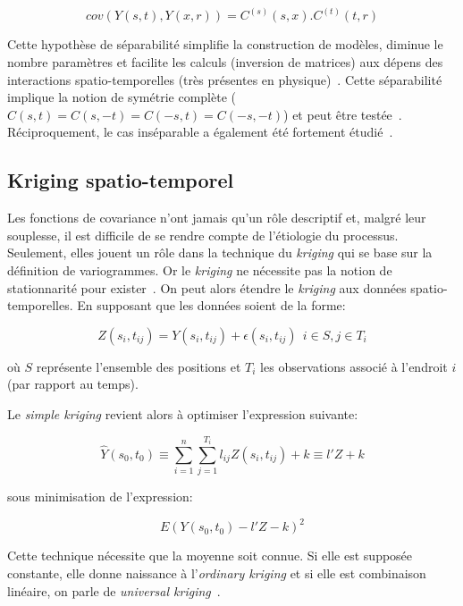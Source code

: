 \begin{equation}
    cov(Y(s, t), Y(x, r)) = C^{(s)}(s, x) . C^{(t)}(t, r)
\end{equation}

Cette hypothèse de séparabilité simplifie la construction de modèles, diminue le nombre paramètres et facilite les calculs (inversion de matrices) aux dépens des interactions spatio-temporelles (très présentes en physique)~\cite{genton2007separable}. Cette séparabilité implique la notion de symétrie complète ($C(s, t) = C(s, -t) = C(-s, t) = C(-s, -t)$) et peut être testée~\cite{fuentes2006testing}. Réciproquement, le cas inséparable a également été fortement étudié~\cite{fuentes2008class}.

\subsection{Kriging spatio-temporel}

Les fonctions de covariance n'ont jamais qu'un rôle descriptif et, malgré leur souplesse, il est difficile de se rendre compte de l'étiologie du processus. Seulement, elles jouent un rôle dans la technique du \textit{kriging} qui se base sur la définition de variogrammes. Or le \textit{kriging} ne nécessite pas la notion de stationnarité pour exister~\cite{cressie1986kriging}. On peut alors étendre le \textit{kriging} aux données spatio-temporelles. En supposant que les données soient de la forme:

\begin{equation}
    Z(s_{i}, t_{ij}) = Y(s_{i}, t_{ij}) + \epsilon(s_{i}, t_{ij}) ~~ i \in S, j \in T_{i}
\end{equation}

où $S$ représente l'ensemble des positions et $T_{i}$ les observations associé à l'endroit $i$ (par rapport au temps).

Le \textit{simple kriging} revient alors à optimiser l'expression suivante:

\begin{equation}
    \hat{Y}(s_{0}, t_{0}) \equiv \sum_{i=1}^{n}\sum_{j=1}^{T_{i}} l_{ij}Z(s_{i}, t_{ij}) + k \equiv l'Z + k
\end{equation}

sous minimisation de l'expression:

\begin{equation}
    E(Y(s_{0}, t_{0}) - l'Z - k)^{2}
\end{equation}

Cette technique nécessite que la moyenne soit connue. Si elle est supposée constante, elle donne naissance à l'\textit{ordinary kriging} et si elle est combinaison linéaire, on parle de \textit{universal kriging}~\cite{ver1993multivariable}.


